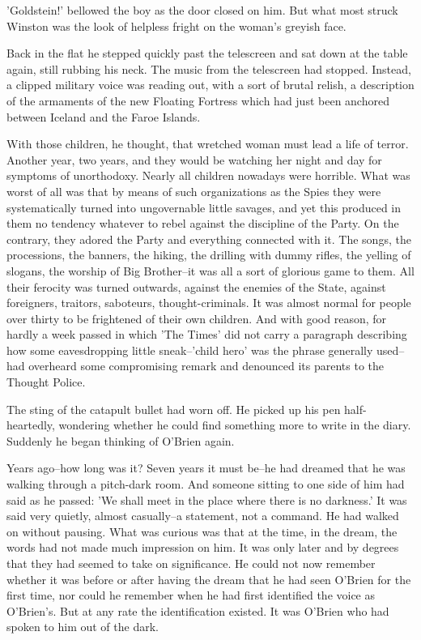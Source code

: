 \documentclass{article}
\begin{document}
'Goldstein!' bellowed the boy as the door closed on him. But what most
struck Winston was the look of helpless fright on the woman's greyish face.

Back in the flat he stepped quickly past the telescreen and sat down at the
table again, still rubbing his neck. The music from the telescreen had
stopped. Instead, a clipped military voice was reading out, with a sort of
brutal relish, a description of the armaments of the new Floating Fortress
which had just been anchored between Iceland and the Faroe Islands.

With those children, he thought, that wretched woman must lead a life of
terror. Another year, two years, and they would be watching her night
and day for symptoms of unorthodoxy. Nearly all children nowadays were
horrible. What was worst of all was that by means of such organizations as
the Spies they were systematically turned into ungovernable little savages,
and yet this produced in them no tendency whatever to rebel against the
discipline of the Party. On the contrary, they adored the Party and
everything connected with it. The songs, the processions, the banners, the
hiking, the drilling with dummy rifles, the yelling of slogans, the worship
of Big Brother--it was all a sort of glorious game to them. All their
ferocity was turned outwards, against the enemies of the State, against
foreigners, traitors, saboteurs, thought-criminals. It was almost normal
for people over thirty to be frightened of their own children. And with
good reason, for hardly a week passed in which 'The Times' did not carry
a paragraph describing how some eavesdropping little sneak--'child hero'
was the phrase generally used--had overheard some compromising remark
and denounced its parents to the Thought Police.

The sting of the catapult bullet had worn off. He picked up his pen
half-heartedly, wondering whether he could find something more to write
in the diary. Suddenly he began thinking of O'Brien again.

Years ago--how long was it? Seven years it must be--he had dreamed that he
was walking through a pitch-dark room. And someone sitting to one side of
him had said as he passed: 'We shall meet in the place where there is no
darkness.' It was said very quietly, almost casually--a statement, not a
command. He had walked on without pausing. What was curious was that at the
time, in the dream, the words had not made much impression on him. It was
only later and by degrees that they had seemed to take on significance. He
could not now remember whether it was before or after having the dream that
he had seen O'Brien for the first time, nor could he remember when he had
first identified the voice as O'Brien's. But at any rate the identification
existed. It was O'Brien who had spoken to him out of the dark.
\end{document}
